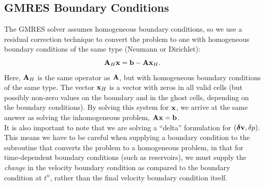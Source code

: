 \documentclass[final]{siamltex}
\def\Ab {{\bf A}}
\def\bb {{\bf b}}
\def\vb {{\bf v}}
\def\xb {{\bf x}}
\def\deltab {\boldsymbol{\delta}}
\begin{document}
\subsection{GMRES Boundary Conditions}
The GMRES solver assumes homogeneous boundary conditions,
so we use a residual correction technique to convert the problem to one
with homogeneous boundary conditions of the same type (Neumann or Dirichlet):
\begin{equation}
\Ab_H\xb = \bb - \Ab\xb_H.
\end{equation}
Here, $\Ab_H$ is the same operator as $\Ab$, but with homogeneous boundary conditions
of the same type.
The vector $\xb_H$ is a vector with zeros in all valid cells (but possibly
non-zero values on the boundary and in the ghost cells, depending on the 
boundary conditions).
By solving this system for $\xb$, we arrive at the same answer as solving the
inhomogeneous problem, $\Ab\xb=\bb$.\\

It is also important to note that we are solving a ``delta'' formulation for
$(\deltab\vb,\delta p)$.  This means we have to be careful when supplying
a boundary condition to the subroutine that converts the problem to a homogeneous
problem, in that for time-dependent boundary conditions (such as reservoirs), we
must supply the {\it change} in the velocity boundary condition as compared to
the boundary condition at $t^n$, rather than the final velocity boundary 
condition itself.



\end{document}
